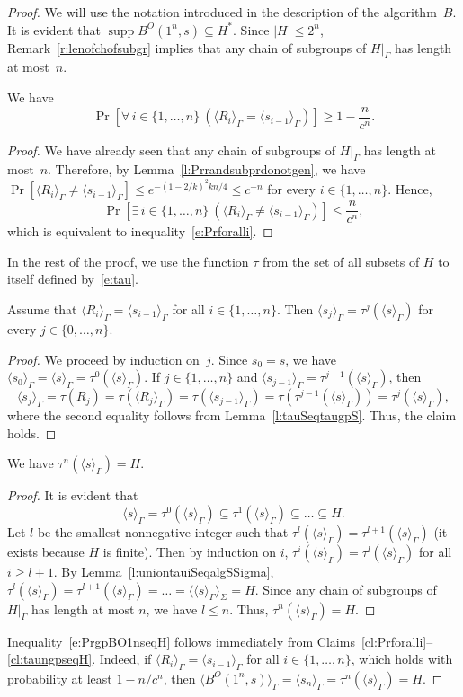 \documentclass[10pt,a4paper]{amsart}
\DeclareMathOperator{\supp}{supp}
\newcommand{\Add}[1]{#1|_\Gamma}
\newcommand{\Exists}[1]{\exists\,#1\ }
\newcommand{\Forall}[1]{\forall\,#1\ }
\newcommand{\Prob}[1]{\Pr[#1]}
\newcommand{\acl}[1]{\lvert#1\rvert}
\newcommand{\alg}[1]{\langle#1\rangle}
\newcommand{\gp}[1]{\langle#1\rangle_\Gamma}
\begin{document}
\begin{proof}
We will use the notation introduced in the description of
the algorithm~$B$. It is evident that $\supp
B^O(1^n,s)\subseteq H^*$. Since $\acl H\le2^n$,
Remark~\ref{r:lenofchofsubgr} implies that any chain of
subgroups of $\Add H$ has length at most~$n$.

\begin{clm}
\label{cl:Prforalli}
We have
\begin{equation}
\label{e:Prforalli}
\Prob{\Forall{i\in\{1,\dots,n\}}(\gp{R_i}=\gp{s_{i-1}})}
\ge1-\frac n{c^n}.
\end{equation}
\end{clm}
\begin{proof}
We have already seen that any chain of subgroups of $\Add H$
has length at most~$n$. Therefore, by
Lemma~\ref{l:Prrandsubprdonotgen}, we have
$\Prob{\gp{R_i}\ne\gp{s_{i-1}}}\le e^{-(1-2/k)^2kn/4}\le
c^{-n}$ for every $i\in\{1,\dots,n\}$. Hence,
\[
\Prob{\Exists{i\in\{1,\dots,n\}}(\gp{R_i}\ne\gp{s_{i-1}})}
\le\frac n{c^n},
\]
which is equivalent to inequality~\eqref{e:Prforalli}.
\end{proof}

In the rest of the proof, we use the function $\tau$ from
the set of all subsets of $H$ to itself defined
by~\eqref{e:tau}.

\begin{clm}
Assume that $\gp{R_i}=\gp{s_{i-1}}$ for all
$i\in\{1,\dots,n\}$. Then $\gp{s_j}=\tau^j(\gp s)$ for every
$j\in\{0,\dots,n\}$.
\end{clm}
\begin{proof}
We proceed by induction on~$j$. Since $s_0=s$, we have
$\gp{s_0}=\gp s=\tau^0(\gp s)$. If $j\in\{1,\dots,n\}$ and
$\gp{s_{j-1}}=\tau^{j-1}(\gp s)$, then
\[
\gp{s_j}=\tau(R_j)=\tau(\gp{R_j})=\tau(\gp{s_{j-1}})
=\tau(\tau^{j-1}(\gp s))=\tau^j(\gp s),
\]
where the second equality follows from
Lemma~\ref{l:tauSeqtaugpS}. Thus, the claim holds.
\end{proof}

\begin{clm}
\label{cl:taungpseqH}
We have $\tau^n(\gp s)=H$.
\end{clm}
\begin{proof}
It is evident that
\[
\gp s=\tau^0(\gp s)\subseteq\tau^1(\gp
s)\subseteq\dots\subseteq H.
\]
Let $l$ be the smallest nonnegative integer such that
$\tau^l(\gp s)=\tau^{l+1}(\gp s)$ (it exists because $H$ is
finite). Then by induction on $i$, $\tau^i(\gp s)=\tau^l(\gp
s)$ for all $i\ge l+1$. By
Lemma~\ref{l:uniontauiSeqalgSSigma}, $\tau^l(\gp
s)=\tau^{l+1}(\gp s)=\dots=\alg{\gp s}_\Sigma=H$. Since any
chain of subgroups of $\Add H$ has length at most $n$, we
have $l\le n$. Thus, $\tau^n(\gp s)=H$.
\end{proof}

Inequality~\eqref{e:PrgpBO1nseqH} follows immediately from
Claims~\ref{cl:Prforalli}--\ref{cl:taungpseqH}. Indeed, if
$\gp{R_i}=\gp{s_{i-1}}$ for all $i\in\{1,\dots,n\}$, which
holds with probability at least $1-n/c^n$, then
$\gp{B^O(1^n,s)}=\gp{s_n}=\tau^n(\gp s)=H$.
\end{proof}
\end{document}

